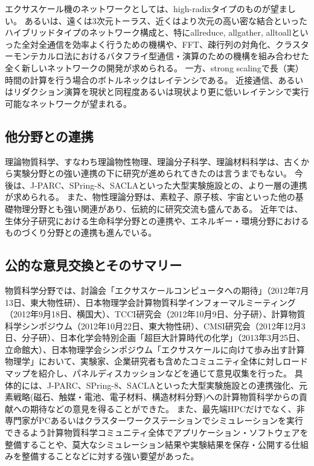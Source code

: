 エクサスケール機のネットワークとしては、high-radixタイプのものが望ましい。
あるいは、遠くは3次元トーラス、近くはより次元の高い密な結合といったハイブリッドタイプのネットワーク構成と、特にallreduce, allgather, alltoallといった全対全通信を効率よく行うための機構や、FFT、疎行列の対角化、クラスターモンテカルロ法におけるバタフライ型通信・演算のための機構を組み合わせた全く新しいネットワークの開発が求められる。
一方、strong scalingで長（実）時間の計算を行う場合のボトルネックはレイテンシである。
近接通信、あるいはリダクション演算を現状と同程度あるいは現状より更に低いレイテンシで実行可能なネットワークが望まれる。



\subsection{他分野との連携}
理論物質科学、すなわち理論物性物理、理論分子科学、理論材料科学は、古くから実験分野との強い連携の下に研究が進められてきたのは言うまでもない。
今後は、J-PARC、SPring-8、SACLAといった大型実験施設との、より一層の連携が求められる。
また、物性理論分野は、素粒子、原子核、宇宙といった他の基礎物理分野とも強い関連があり、伝統的に研究交流も盛んである。
近年では、生体分子研究における生命科学分野との連携や、エネルギー・環境分野におけるものづくり分野との連携も進んでいる。


\subsection{公的な意見交換とそのサマリー}
物質科学分野では、討論会「エクサスケールコンピュータへの期待」（2012年7月13日、東大物性研）、日本物理学会計算物質科学インフォーマルミーティング（2012年9月18日、横国大）、TCCI研究会（2012年10月9日、分子研）、計算物質科学シンポジウム（2012年10月22日、東大物性研）、CMSI研究会（2012年12月3日、分子研）、日本化学会特別企画「超巨大計算時代の化学」（2013年3月25日、立命館大）、日本物理学会シンポジウム「エクサスケールに向けて歩み出す計算物理学」において、実験家、企業研究者も含めたコミュニティ全体に対しロードマップを紹介し、パネルディスカッションなどを通じて意見収集を行った。
具体的には、J-PARC、SPring-8、SACLAといった大型実験施設との連携強化、元素戦略(磁石、触媒・電池、電子材料、構造材料分野)への計算物質科学からの貢献への期待などの意見を得ることができた。
また、最先端HPCだけでなく、非専門家がPCあるいはクラスターワークステーションでシミュレーションを実行できるよう計算物質科学コミュニティ全体でアプリケーション・ソフトウェアを整備することや、莫大なシミュレーション結果や実験結果を保存・公開する仕組みを整備することなどに対する強い要望があった。


